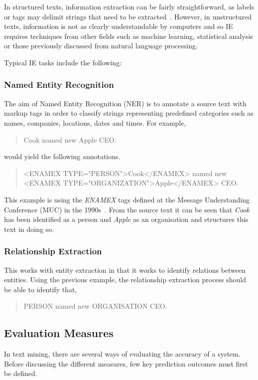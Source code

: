 In structured texts, information extraction can be fairly straightforward, as labels or tags may delimit strings that need to be extracted~\cite{soderland99}. However, in unstructured texts, information is not as clearly understandable by computers and so IE requires techniques from other fields such as machine learning, statistical analysis or those previously discussed from natural language processing.

Typical IE tasks include the following:

\subsubsection{Named Entity Recognition}
The aim of Named Entity Recognition (NER) is to annotate a source text with markup tags in order to classify strings representing predefined categories such as names, companies, locations, dates and times. For example,
\begin{quote}
Cook named new Apple CEO.
\end{quote}
would yield the following annotations.
\begin{quote}
<ENAMEX TYPE="PERSON">Cook</ENAMEX> named new
\newline
<ENAMEX TYPE="ORGANIZATION">Apple</ENAMEX> CEO.
\end{quote}

This example is using the \emph{ENAMEX} tags defined at the Message Understanding Conference (MUC) in the 1990s~\cite{grishman96muc}. From the source text it can be seen that \emph{Cook} has been identified as a person and \emph{Apple} as an organisation and structures this text in doing so.

\subsubsection{Relationship Extraction}
This works with entity extraction in that it works to identify relations between entities. Using the previous example, the relationship extraction process should be able to identify that,
\begin{quote}
PERSON named new ORGANISATION CEO.
\end{quote}


\subsection{Evaluation Measures}
In text mining, there are several ways of evaluating the accuracy of a system. Before discussing the different measures, few key prediction outcomes must first be defined.

